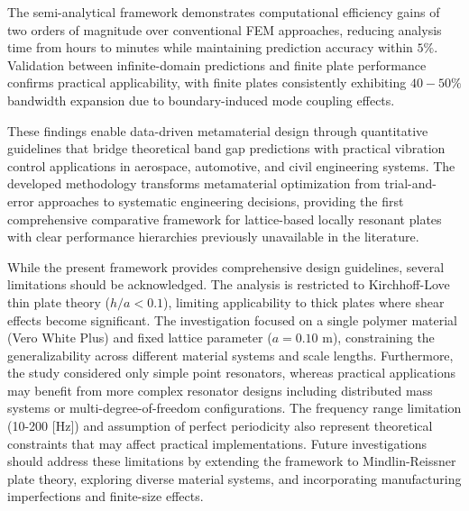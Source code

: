 \documentclass[review,numbers,sort&compress]{elsarticle}
\begin{document}
{The semi-analytical framework demonstrates computational efficiency gains of two orders of magnitude over conventional FEM approaches, reducing analysis time from hours to minutes while maintaining prediction accuracy within $5\%$. Validation between infinite-domain predictions and finite plate performance confirms practical applicability, with finite plates consistently exhibiting $40-50\%$ bandwidth expansion due to boundary-induced mode coupling effects.

These findings enable data-driven metamaterial design through quantitative guidelines that bridge theoretical band gap predictions with practical vibration control applications in aerospace, automotive, and civil engineering systems. The developed methodology transforms metamaterial optimization from trial-and-error approaches to systematic engineering decisions, providing the first comprehensive comparative framework for lattice-based locally resonant plates with clear performance hierarchies previously unavailable in the literature.

While the present framework provides comprehensive design guidelines, several limitations should be acknowledged. The analysis is restricted to Kirchhoff-Love thin plate theory ($h/a < 0.1$), limiting applicability to thick plates where shear effects become significant. The investigation focused on a single polymer material (Vero White Plus) and fixed lattice parameter ($a = 0.10$ m), constraining the generalizability across different material systems and scale lengths. Furthermore, the study considered only simple point resonators, whereas practical applications may benefit from more complex resonator designs including distributed mass systems or multi-degree-of-freedom configurations. The frequency range limitation (10-200 [Hz]) and assumption of perfect periodicity also represent theoretical constraints that may affect practical implementations. Future investigations should address these limitations by extending the framework to Mindlin-Reissner plate theory, exploring diverse material systems, and incorporating manufacturing imperfections and finite-size effects.

}
\end{document}
